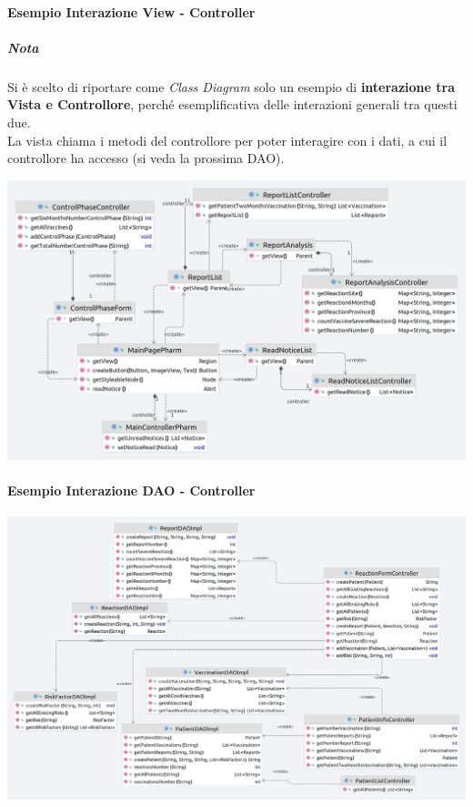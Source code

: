 \documentclass{article}
\begin{document}
    \paragraph*{Esempio Interazione View - Controller}
        \subparagraph*{Nota} Si è scelto di riportare come \textit{Class Diagram} solo un esempio di \textbf{interazione tra Vista e Controllore}, perché esemplificativa delle interazioni generali tra questi due.\\
        La vista chiama i metodi del controllore per poter interagire con i dati, a cui il controllore ha accesso (si veda la prossima DAO).
        \begin{center}
            \includegraphics[width=1\textwidth]{pictures/ExampleControlViewInteraction.png}
        \end{center}
    \paragraph*{Esempio Interazione DAO - Controller}
        \begin{center}
            \includegraphics[width=1\textwidth]{pictures/ControllerDati.png}
        \end{center}
\end{document}
